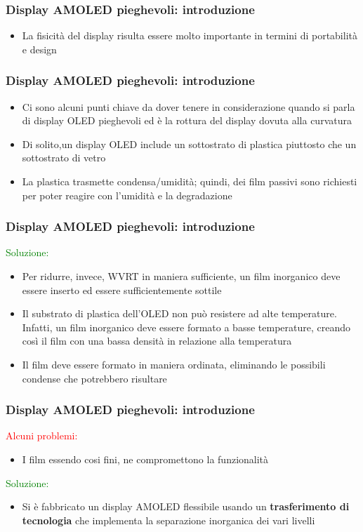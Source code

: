 \documentclass[12pt]{beamer}
\begin{document}
	\begin{frame}
		\frametitle{Display AMOLED pieghevoli: introduzione}
		\begin{itemize}
			\item La fisicità del display risulta essere molto importante in termini di portabilità e design
		\end{itemize}
	\end{frame}
	\begin{frame}
		\frametitle{Display AMOLED pieghevoli: introduzione}
		\begin{itemize}
			\item Ci sono alcuni punti chiave da dover tenere in considerazione quando si parla di display OLED pieghevoli ed è la rottura del display dovuta alla curvatura
			\pause
			\item Di solito,un display OLED include un sottostrato di plastica piuttosto che un sottostrato di vetro
			\pause
			\item La plastica trasmette condensa/umidità; quindi, dei film passivi sono richiesti per poter reagire con l’umidità e la degradazione
		\end{itemize}
	\end{frame}
	\begin{frame}
		\frametitle{Display AMOLED pieghevoli: introduzione}
		\textcolor{green}{Soluzione:}
		\begin{itemize}
			\item Per ridurre, invece, WVRT in maniera sufficiente, un film inorganico deve essere inserto ed essere sufficientemente sottile
			\pause
			\item Il substrato di plastica dell’OLED non può resistere ad alte temperature. Infatti, un film inorganico deve essere
			formato a basse temperature, creando così il film con una bassa densità in relazione alla temperatura
			\pause
			\item Il film deve essere formato in maniera ordinata, eliminando le possibili condense che potrebbero risultare
		\end{itemize}
	\end{frame}
	\begin{frame}
		\frametitle{Display AMOLED pieghevoli: introduzione}
		\textcolor{red}{Alcuni problemi:}
		\begin{itemize}
			\item I film essendo cosi fini, ne compromettono la funzionalità
			\pause
		\end{itemize}
		\textcolor{green}{Soluzione:}
		\begin{itemize}
			\item Si è fabbricato un display AMOLED flessibile usando un \textbf{trasferimento di tecnologia} che implementa la separazione inorganica dei vari livelli
		\end{itemize}
	\end{frame}
\end{document}
